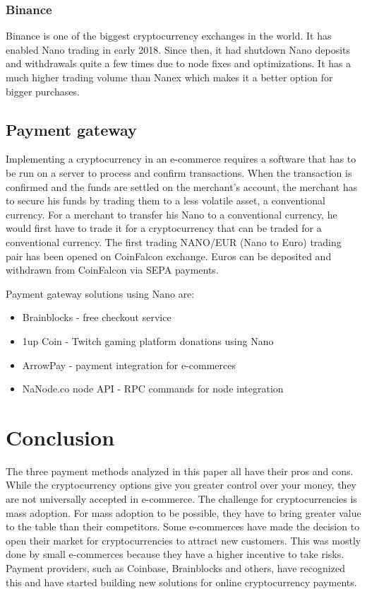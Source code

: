 \documentclass{ferseminar}
\begin{document}
\subsubsection{Binance}
Binance is one of the biggest cryptocurrency exchanges in the world. It has enabled Nano trading in early 2018. Since then, it had shutdown Nano deposits and withdrawals quite a few times due to node fixes and optimizations. It has a much higher trading volume than Nanex which makes it a better option for bigger purchases.
 
\subsection{Payment gateway}
Implementing a cryptocurrency in an e-commerce requires a software that has to be run on a server to process and confirm transactions. When the transaction is confirmed and the funds are settled on the merchant's account, the merchant has to secure his funds by trading them to a less volatile asset, a conventional currency. For a merchant to transfer his Nano to a conventional currency, he would first have to trade it for a cryptocurrency that can be traded for a conventional currency. The first trading NANO/EUR (Nano to Euro) trading pair has been opened on CoinFalcon exchange. Euros can be deposited and withdrawn from CoinFalcon via SEPA payments. 

Payment gateway solutions using Nano are:
\begin{itemize}
	\item Brainblocks -  free checkout service
	\item 1up Coin - Twitch gaming platform donations using Nano
	\item ArrowPay - payment integration for e-commerces
	\item NaNode.co node API - RPC commands for node integration
\end{itemize}

\section{Conclusion}
The three payment methods analyzed in this paper all have their pros and cons. While the cryptocurrency options give you greater control over your money, they are not universally accepted in e-commerce. The challenge for cryptocurrencies is mass adoption. For mass adoption to be possible, they have to bring greater value to the table than their competitors. Some e-commerces have made the decision to open their market for cryptocurrencies to attract new customers. This was mostly done by small e-commerces because they have a higher incentive to take risks. Payment providers, such as Coinbase, Brainblocks and others, have recognized this and have started building new solutions for online cryptocurrency payments.
\end{document}

